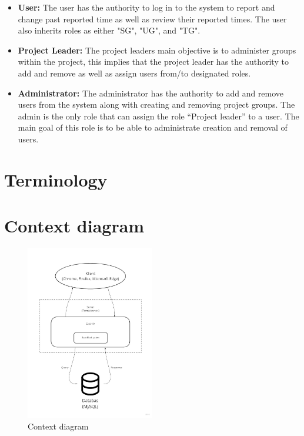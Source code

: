 \documentclass{article}
\begin{document}
\begin{itemize}
  \item \textbf{User:} The user has the authority to log in to the system to report and  change past reported time as well as review their reported times. The user also inherits roles as either "SG", "UG", and "TG".
  \item \textbf{Project Leader:}
  The project leaders main objective is to administer groups within the project, this implies that the project leader has the authority to add and remove as well as assign users from/to designated roles.
   \item \textbf{Administrator:} The administrator has the authority to add and remove users from the system along with creating and removing project groups. The admin is the only role that can assign the role “Project leader” to a user. The main goal of this role is to be able to administrate creation and removal of users.
\end{itemize}




\section{Terminology}



\section{Context diagram}
\begin{figure}[placement specifier]
\centering
\includegraphics[width=0.5\textwidth]{Flowchart_6.jpg}
\caption{Context diagram}
\end{figure}
\end{document}
